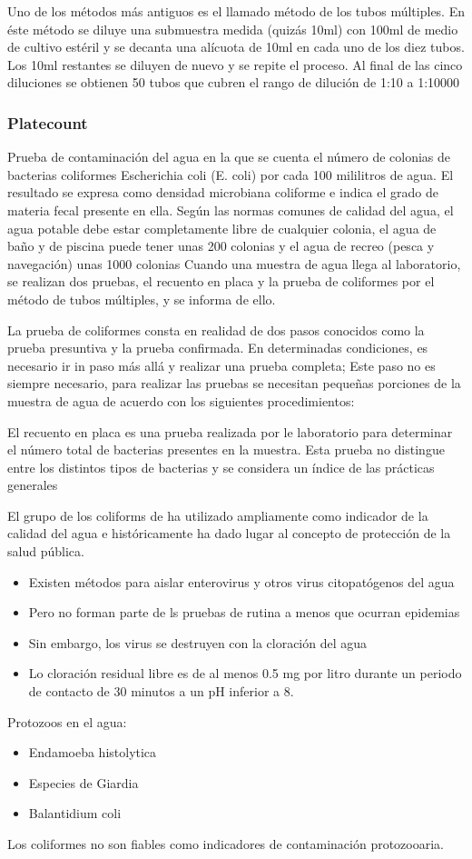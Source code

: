 Uno de los métodos más antiguos es el llamado método de los tubos múltiples. En éste método se diluye una submuestra medida (quizás 10ml) con 100ml de medio de cultivo estéril y se decanta una alícuota de 10ml en cada uno de los diez tubos. Los 10ml restantes se diluyen de nuevo y se repite el proceso. Al final de las cinco diluciones se obtienen 50 tubos que cubren el rango de dilución de 1:10 a 1:10000
\subsubsection{Platecount}
Prueba de contaminación del agua en la que se cuenta el número de colonias de bacterias coliformes Escherichia coli (E. coli) por cada 100 mililitros de agua. El resultado se expresa como densidad microbiana coliforme e indica el grado de materia fecal presente en ella.
Según las normas comunes de calidad del agua, el agua potable debe estar completamente libre de cualquier colonia, el agua de baño y de piscina puede tener unas 200 colonias y el agua de recreo (pesca y navegación) unas 1000 colonias
Cuando una muestra de agua llega al laboratorio, se realizan dos pruebas, el recuento en placa y la prueba de coliformes por el método de tubos múltiples, y se informa de ello.

La prueba de coliformes consta en realidad de dos pasos conocidos como la prueba presuntiva y la prueba confirmada. En determinadas condiciones, es necesario ir in paso más allá y realizar una prueba completa; Este paso no es siempre necesario, para realizar las pruebas se necesitan pequeñas porciones de la muestra de agua de acuerdo con los siguientes procedimientos:

El recuento en placa es una prueba realizada por le laboratorio para determinar el número total de bacterias presentes en la muestra. Esta prueba no distingue entre los distintos tipos de bacterias y se considera un índice de las prácticas generales

El grupo de los coliforms de ha utilizado ampliamente como indicador de la calidad del agua e históricamente ha dado lugar al concepto de protección de la salud pública.
\begin{itemize}
    \item Existen métodos para aislar enterovirus y otros virus citopatógenos del agua
    \item Pero no forman parte de ls pruebas de rutina a menos que ocurran epidemias
    \item Sin embargo, los virus se destruyen con la cloración del agua
    \item Lo cloración residual libre es de al menos 0.5 mg por litro durante un periodo de contacto de 30 minutos a un pH inferior a 8.
\end{itemize}
Protozoos en el agua:
\begin{itemize}
    \item Endamoeba histolytica
    \item Especies de Giardia
    \item Balantidium coli
\end{itemize}
Los coliformes no son fiables como indicadores de contaminación protozooaria.
